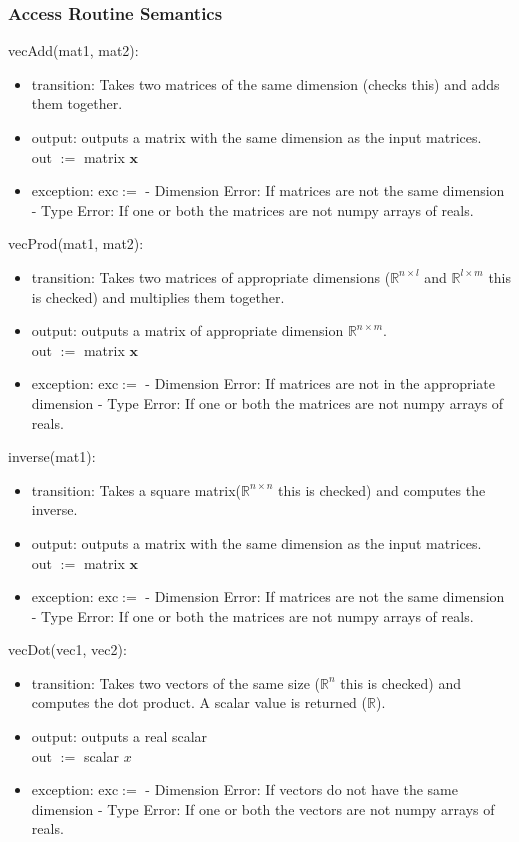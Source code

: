 \documentclass[12pt, titlepage]{article}
\begin{document}
\subsubsection{Access Routine Semantics}
\noindent
vecAdd(mat1, mat2):
\begin{itemize}
\item transition: Takes two matrices of the same dimension (checks this) and adds them together.
\item output: outputs a matrix with the same dimension as the input matrices.
\\
out $:=$ matrix $\mathbf{x}$
\item exception: exc$:=$
\subitem -  Dimension Error: If matrices are not the same dimension
\subitem - Type Error: If one or both the matrices are not numpy arrays of reals.
\end{itemize}
vecProd(mat1, mat2):
\begin{itemize}
\item transition: Takes two matrices of appropriate dimensions ($\mathbb{R}^{n\times l}$ and $\mathbb{R}^{l\times m}$ this is checked) and multiplies them together.
\item output: outputs a matrix of appropriate dimension $\mathbb{R}^{n\times m}$.
\\
out $:=$ matrix $\mathbf{x}$
\item exception: exc$:=$
\subitem -  Dimension Error: If matrices are not in the appropriate dimension
\subitem - Type Error: If one or both the matrices are not numpy arrays of reals.
\end{itemize}
inverse(mat1):
\begin{itemize}
\item transition: Takes a square matrix($\mathbb{R}^{n\times n}$ this is checked) and computes the inverse.
\item output: outputs a matrix with the same dimension as the input matrices.
\\
out $:=$ matrix $\mathbf{x}$
\item exception: exc$:=$
\subitem -  Dimension Error: If matrices are not the same dimension
\subitem - Type Error: If one or both the matrices are not numpy arrays of reals.
\end{itemize}
vecDot(vec1, vec2):
\begin{itemize}
\item transition: Takes two vectors of the same size ($\mathbb{R}^{n}$ this is checked) and computes the dot product. A scalar value is returned ($\mathbb{R}$).
\item output: outputs a real scalar
\\
out $:=$ scalar $x$
\item exception: exc$:=$
\subitem -  Dimension Error: If vectors do not have the same dimension
\subitem - Type Error: If one or both the vectors are not numpy arrays of reals.
\end{itemize}
\end{document}

